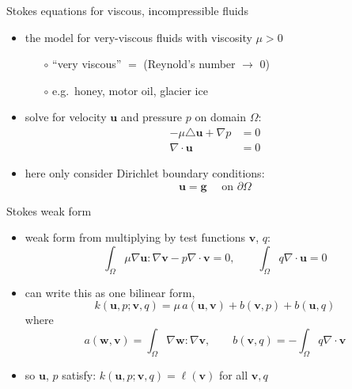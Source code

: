 \documentclass[hide notes,intlimits,usenames,dvipsnames]{beamer}
\newcommand{\bg}{\mathbf{g}}
\newcommand{\bu}{\mathbf{u}}
\newcommand{\bv}{\mathbf{v}}
\newcommand{\bw}{\mathbf{w}}
\newcommand{\Div}{\nabla\cdot}
\newcommand{\grad}{\nabla}
\begin{document}
\begin{frame}{Stokes equations for viscous, incompressible fluids}

\begin{itemize}
\item the model for very-viscous fluids with viscosity $\mu>0$
    \begin{itemize}
    \item[$\circ$] ``very viscous'' $=$ (Reynold's number $\to$ 0)
    \item[$\circ$] e.g.~honey, motor oil, glacier ice
    \end{itemize}
\item solve for velocity $\bu$ and pressure $p$ on domain $\Omega$:
\begin{align*}
- \mu \triangle \bu + \grad p &= 0 \\
\Div \bu &= 0
\end{align*}
\item here only consider Dirichlet boundary conditions:
    $$\bu = \bg \quad \text{ on } \partial \Omega$$
\end{itemize}
\end{frame}


\begin{frame}{Stokes weak form}

\begin{itemize}
\item weak form from multiplying by test functions $\bv$, $q$:
\begin{equation*}
\int_\Omega \mu \grad \bu : \grad \bv - p \Div \bv = 0, \qquad \int_\Omega q \Div \bu = 0
\end{equation*}
\item can write this as one bilinear form,
\begin{equation*}
    k(\bu,p;\bv,q) = \mu\, a(\bu,\bv) + b(\bv,p) + b(\bu,q)
\end{equation*}
where
\begin{equation*}
    a(\bw,\bv) = \int_\Omega \grad \bw : \grad \bv, \qquad b(\bv,q) = - \int_\Omega q \Div \bv
\end{equation*}
\item so $\bu$, $p$ satisfy: \qquad $k(\bu,p;\bv,q) = \ell(\bv)$ for all $\bv, q$
\end{itemize}
\end{frame}
\end{document}
